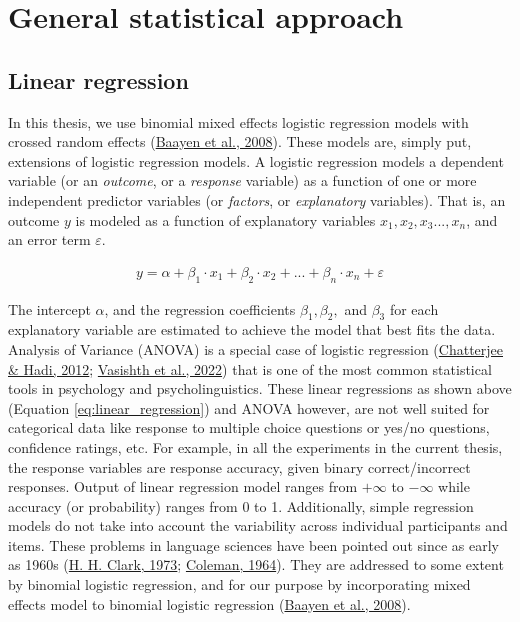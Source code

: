\documentclass[a4paper, nobind]{templates/ociamthesis}
\renewcommand{\chaptermark}[1]{\markboth{\thechapter. #1}{\thechapter. #1}}
\begin{document}
\hypertarget{chapter-stats}{%
\chapter{General statistical approach}\label{chapter-stats}}

\chaptermark{Statistics}

\hypertarget{linear-regression}{%
\section{Linear regression}\label{linear-regression}}

In this thesis, we use binomial mixed effects logistic regression models with crossed random effects (\protect\hyperlink{ref-Baayen2008}{Baayen et al., 2008}).
These models are, simply put, extensions of logistic regression models.
A logistic regression models a dependent variable (or an \emph{outcome}, or a \emph{response} variable) as a function of one or more independent predictor variables (or \emph{factors}, or \emph{explanatory} variables).
That is, an outcome \(y\) is modeled as a function of explanatory variables \(x_1, x_2, x_3..., x_n\), and an error term \(\varepsilon\).

\begin{align} \label{eq:linear_regression}
y =
\alpha + 
\beta_{1}\cdot{x_1} + 
\beta_{2}\cdot{x_2} + ... +
\beta_{n}\cdot{x_n} + \varepsilon 
\end{align}

The intercept \(\alpha\), and the regression coefficients \(\beta_1, \beta_2,\) and \(\beta_3\) for each explanatory variable are estimated to achieve the model that best fits the data.
Analysis of Variance (ANOVA) is a special case of logistic regression (\protect\hyperlink{ref-Chatterjee2012}{Chatterjee \& Hadi, 2012}; \protect\hyperlink{ref-Vasishth2022}{Vasishth et al., 2022}) that is one of the most common statistical tools in psychology and psycholinguistics.
These linear regressions as shown above (Equation \ref{eq:linear_regression}) and ANOVA however, are not well suited for categorical data like response to multiple choice questions or yes/no questions, confidence ratings, etc.
For example, in all the experiments in the current thesis, the response variables are response accuracy, given binary correct/incorrect responses.
Output of linear regression model ranges from \(+\infty\) to \(-\infty\) while accuracy (or probability) ranges from 0 to 1.
Additionally, simple regression models do not take into account the variability across individual participants and items.
These problems in language sciences have been pointed out since as early as 1960s (\protect\hyperlink{ref-Clark1973}{H. H. Clark, 1973}; \protect\hyperlink{ref-Coleman1964}{Coleman, 1964}).
They are addressed to some extent by binomial logistic regression, and for our purpose by incorporating mixed effects model to binomial logistic regression (\protect\hyperlink{ref-Baayen2008}{Baayen et al., 2008}).
\end{document}
